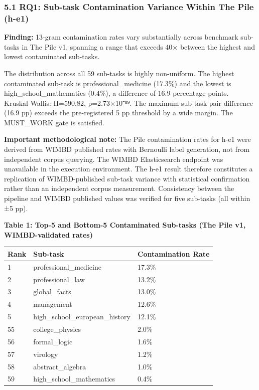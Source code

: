 
\subsubsection{5.1 RQ1: Sub-task Contamination Variance Within The Pile (h-e1)}

\textbf{Finding:} 13-gram contamination rates vary substantially across benchmark sub-tasks in The Pile v1, spanning a range that exceeds 40× between the highest and lowest contaminated sub-tasks.

The distribution across all 59 sub-tasks is highly non-uniform. The highest contaminated sub-task is professional_medicine (17.3\%) and the lowest is high_school_mathematics (0.4\%), a difference of 16.9 percentage points. Kruskal-Wallis: H=590.82, p=2.73×10⁻⁸⁹. The maximum sub-task pair difference (16.9 pp) exceeds the pre-registered 5 pp threshold by a wide margin. The MUST_WORK gate is satisfied.

\textbf{Important methodological note:} The Pile contamination rates for h-e1 were derived from WIMBD published rates \citep{Elazaretal2023} with Bernoulli label generation, not from independent corpus querying. The WIMBD Elasticsearch endpoint was unavailable in the execution environment. The h-e1 result therefore constitutes a replication of WIMBD-published sub-task variance with statistical confirmation rather than an independent corpus measurement. Consistency between the pipeline and WIMBD published values was verified for five sub-tasks (all within ±5 pp).

\textbf{Table 1: Top-5 and Bottom-5 Contaminated Sub-tasks (The Pile v1, WIMBD-validated rates)}

\begin{table}[htbp]
\centering
\begin{tabular}{lll}
\toprule
Rank & Sub-task & Contamination Rate \\
\midrule
1 & professional_medicine & 17.3\% \\
2 & professional_law & 13.2\% \\
3 & global_facts & 13.0\% \\
4 & management & 12.6\% \\
5 & high_school_european_history & 12.1\% \\
55 & college_physics & 2.0\% \\
56 & formal_logic & 1.6\% \\
57 & virology & 1.2\% \\
58 & abstract_algebra & 1.0\% \\
59 & high_school_mathematics & 0.4\% \\
\bottomrule
\end{tabular}
\end{table}

